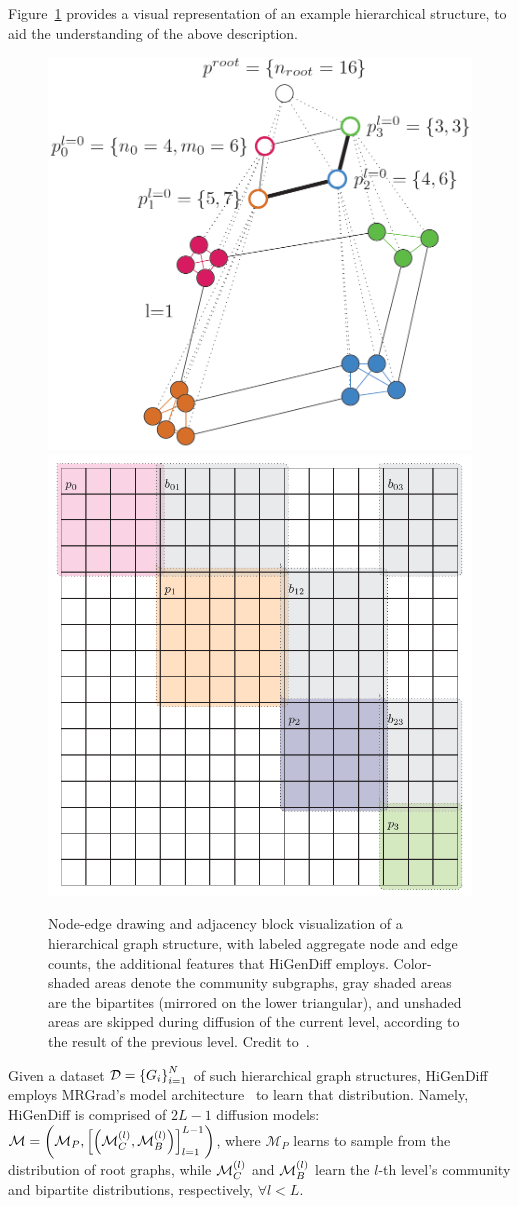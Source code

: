 Figure~\ref{fig:higendiff} provides a visual representation of an example hierarchical structure, to aid the understanding of the above description.
\begin{figure}[H]
    \centering
    \includegraphics[width=0.45\linewidth]{figures/higendiff/hierarchical_graph.png}
    \hfill
    \includegraphics[width=0.45\linewidth]{figures/higendiff/hierarchical_adj.png}
    \caption[Node-edge drawing and adjacency block visualization of a hierarchical graph structure.]{Node-edge drawing and adjacency block visualization of a hierarchical graph structure, with labeled aggregate node and edge counts, the additional features that HiGenDiff employs. Color-shaded areas denote the community subgraphs, gray shaded areas are the bipartites (mirrored on the lower triangular), and unshaded areas are skipped during diffusion of the current level, according to the result of the previous level. Credit to~\cite{karami_multi-resolution_2024}.}
    \label{fig:higendiff}
\end{figure}
Given a dataset $\mathcal{D}=\mathopen{}\left\{G_i\right\}_{i=1}^{N}$ of such hierarchical graph structures, HiGenDiff employs MRGrad's model architecture~\cite{karami_multi-resolution_2024} to learn that distribution. Namely, HiGenDiff is comprised of $2L-1$ diffusion models: $\mathcal{M}=\mathopen{}\left(\mathcal{M}_P,\mathopen{}\left[\mathopen{}\left(\mathcal{M}^{\mathopen{}\left(l\right)}_C,\mathcal{M}^{\mathopen{}\left(l\right)}_B\right)\right]_{l=1}^{L-1}\right)$, where $\mathcal{M}_P$ learns to sample from the distribution of root graphs, while $\mathcal{M}^{\mathopen{}\left(l\right)}_C$ and $\mathcal{M}^{\mathopen{}\left(l\right)}_B$ learn the $l$-th level's community and bipartite distributions, respectively, $\forall l<L$. 


